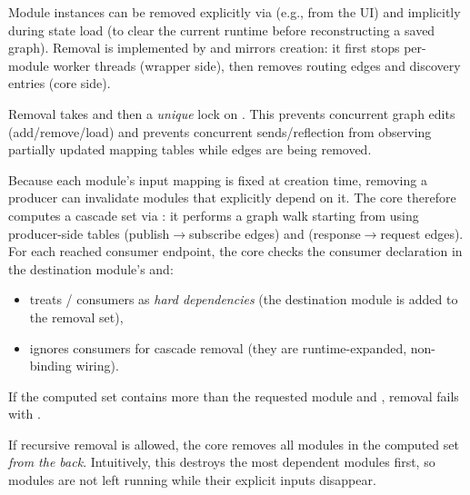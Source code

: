 Module instances can be removed explicitly via  (e.g., from the UI) and implicitly during state load (to clear the current runtime before reconstructing a saved graph).
Removal is implemented by  and mirrors creation: it first stops per-module worker threads (wrapper side), then removes routing edges and discovery entries (core side).

Removal takes  and then a \emph{unique} lock on .
This prevents concurrent graph edits (add/remove/load) and prevents concurrent sends/reflection from observing partially updated mapping tables while edges are being removed.

Because each module's input mapping is fixed at creation time, removing a producer can invalidate modules that explicitly depend on it.
The core therefore computes a cascade set via :
it performs a graph walk starting from  using producer-side tables  (publish$\rightarrow$subscribe edges) and  (response$\rightarrow$request edges).
For each reached consumer endpoint, the core checks the consumer declaration in the destination module's  and:
\begin{itemize}
    \item treats / consumers as \emph{hard dependencies} (the destination module is added to the removal set),
    \item ignores  consumers for cascade removal (they are runtime-expanded, non-binding wiring).
\end{itemize}
If the computed set contains more than the requested module and , removal fails with .

If recursive removal is allowed, the core removes all modules in the computed set \emph{from the back}.
Intuitively, this destroys the most dependent modules first, so modules are not left running while their explicit inputs disappear.

